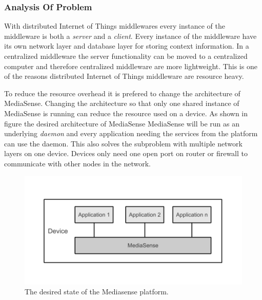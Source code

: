\subsubsection{Analysis Of Problem}
With distributed Internet of Things middlewares every instance of the middleware is both a \emph{server} and a \emph{client}. Every instance of the middleware have its own network layer and database layer for storing context information. In a centralized middleware the server functionality can be moved to a centralized computer and therefore centralized middleware are more lightweight. This is one of the reasons distributed Internet of Things middleware are resource heavy. 

To reduce the resource overhead it is prefered to change the architecture of MediaSense. Changing the architecture so that only one shared instance of MediaSense is running can reduce the resource used on a device.  As shown in figure the desired architecture of MediaSense MediaSense will be run as an underlying  \emph{daemon} and every application needing the services from the platform can use the daemon. This also solves the subproblem with multiple network layers on one device. Devices only need one open port on router or firewall to communicate with other nodes in the network.  

\begin{figure}[h!]
	\centering
    	\includegraphics{part_4/result_and_analysis/mediasense_arch_new.pdf}
    	\centering
		\caption{The desired state of the Mediasense platform.} 
\end{figure}
